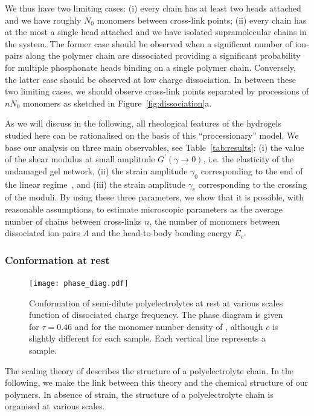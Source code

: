\documentclass[journal=jacsat,manuscript=article]{achemso}
\begin{document}
We thus have two limiting cases: (i) every chain has at least two heads attached and we have roughly $N_0$ monomers between cross-link points; (ii) every chain has at the most a single head attached and we have isolated supramolecular chains in the system. The former case should be observed when a significant number of ion-pairs along the polymer chain are dissociated providing a significant probability for multiple phosphonate heads binding on a single polymer chain. Conversely, the latter case should be observed at low charge dissociation. In between these two limiting cases, we should observe cross-link points separated by processions of $n N_0$ monomers as sketched in Figure~\ref{fig:dissociation}a.

As we will discuss in the following, all rheological features of the hydrogels studied here can  be rationalised on the basis of this ``processionary'' model. We base our analysis on three main observables, see Table~\ref{tab:results}: (i) the value of the shear modulus at small amplitude $G^\prime(\gamma\rightarrow 0)$, i.e. the elasticity of the undamaged gel network, (ii) the strain amplitude $\gamma_0$ corresponding to the end of the linear regime~\cite{Hyun2011}, and (iii) the strain amplitude $\gamma_c$ corresponding to the crossing of the moduli. By using these three parameters, we show that it is possible, with reasonable assumptions, to estimate microscopic parameters as the average number of chains between cross-links $n$, the number of monomers between dissociated ion pairs $A$ and the head-to-body bonding energy $E_c$.


\subsubsection{Conformation at rest}
\begin{figure}
\texttt{[image: phase\_diag.pdf]}
\caption{Conformation of semi-dilute polyelectrolytes at rest at various scales function of dissociated charge frequency. The phase diagram is given for $\tau=0.46$ and for the monomer number density of , although $c$ is slightly different for each sample. Each vertical line represents a sample.}
\end{figure}

The scaling theory of \citet{Rubinstein1996} describes the structure of a polyelectrolyte chain. In the following, we make the link between this theory and the chemical structure of our polymers. In absence of strain, the structure of a polyelectrolyte chain is organised at various scales.
\end{document}
